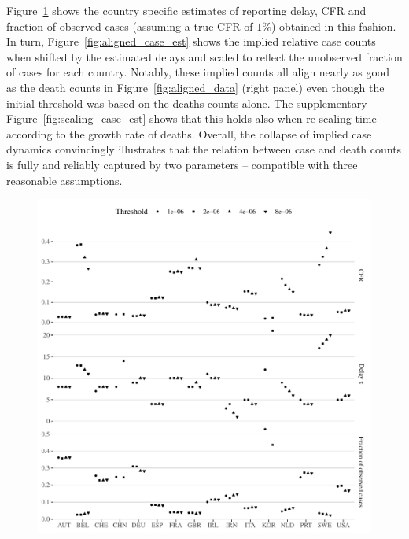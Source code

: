 \documentclass[fullpage,a4paper]{article}
\newcommand{\fig}[1]{Figure~\ref{fig:#1}}
\begin{document}
\fig{estimates} shows the country specific estimates of reporting
delay, CFR and fraction of observed cases (assuming a true CFR of
$1\%$) obtained in this fashion. In turn, \fig{aligned_case_est} shows
the implied relative case counts when shifted by the estimated delays
and scaled to reflect the unobserved fraction of cases for each
country. Notably, these implied counts all align nearly as good as the
death counts in \fig{aligned_data} (right panel) even though the
initial threshold was based on the deaths counts alone. The
supplementary \fig{scaling_case_est} shows that this holds also when
re-scaling time according to the growth rate of deaths. Overall, the
collapse of implied case dynamics convincingly illustrates that the
relation between case and death counts is fully and reliably captured
by two parameters -- compatible with three reasonable assumptions.
\begin{figure}
  \includegraphics[width=1\textwidth]{../figs/ecdc_estimates.pdf}
  \caption{\label{fig:estimates}}
\end{figure}
\end{document}
